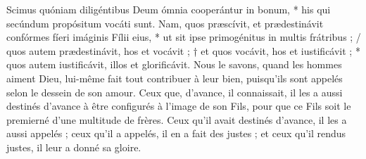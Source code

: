 \documentclass[Session2024.tex]{subfiles}
\begin{document}
{Scimus quóniam diligéntibus Deum ómnia cooperántur in bonum, *
his qui secúndum propósitum vocáti sunt. Nam, quos præscívit,
et prædestinávit confórmes fíeri imáginis Fílii eius, * ut sit ipse
primogénitus in multis frátribus ; / quos autem prædestinávit, hos et
vocávit ; † et quos vocávit, hos et iustificávit ; * quos autem iustificávit,
illos et glorificávit.}
{Nous le savons, quand les hommes aiment Dieu, lui-même fait tout
contribuer à leur bien, puisqu’ils sont appelés selon le dessein de son
amour. Ceux que, d’avance, il connaissait, il les a aussi destinés d’avance
à être configurés à l’image de son Fils, pour que ce Fils soit le premierné
d’une multitude de frères. Ceux qu’il avait destinés d’avance, il les a
aussi appelés ; ceux qu’il a appelés, il en a fait des justes ; et ceux qu’il
rendus justes, il leur a donné sa gloire.}




\label{0722V}


\end{document}
